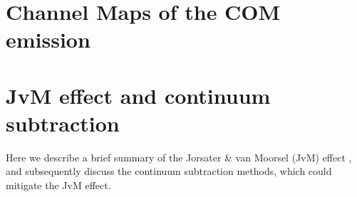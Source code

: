 \documentclass[linenumbers, twocolumn, twocolappendix, astrosymb, times]{aastex631}
\newcommand{\methanol}{CH$_3$OH\xspace}
\newcommand{\acetaldehyde}{CH$_3$CHO\xspace}
\newcommand{\methylformate}{CH$_3$OCHO\xspace}
\begin{document}
\appendix
\section{Channel Maps of the COM emission}\label{appendix:channel_maps}
\begin{figure*}
\caption{Channel maps of the \methanol $2_{-1,1}$ -- $1_{-1,0}$ E $v_t=0$ transition. The black contours mark the [$-$3, 3, 5, 7, ...]$\,\times\,\sigma$ levels. The dashed contours indicate the negative values. The numbers in the upper-right and upper-left corners indicate the velocity of the channel and its corresponding Keplerian radius ($r = GM_\star\sin^2i/v^2$), respectively. The red cross in each panel indicate the position of the disk center. The beam is shown in the lower-left corner of the lower-left panel.}
\label{fig:channelmap_CH3OH}
\end{figure*}

\begin{figure*}
\caption{Same as Figure \ref{fig:channelmap_CH3OH}, but for \methylformate $8_{5,3}$ -- $7_{5,2}$ A $v_t=0$ transition.}
\label{fig:channelmap_CH3OCHO}
\end{figure*}

\begin{figure*}
\caption{Same as Figure \ref{fig:channelmap_CH3OH}, but for \acetaldehyde $5_{2,3}$ -- $4_{2,2}$ E $v_t=0$ transition.}
\label{fig:channelmap_CH3CHO}
\end{figure*}

\section{JvM effect and continuum subtraction}\label{appendix:JvM_effect}
Here we describe a brief summary of the Jorsater \& van Moorsel (JvM) effect \citep{JvM, Czekala2021}, and subsequently discuss the continuum subtraction methods, which could mitigate the JvM effect.
\end{document}
